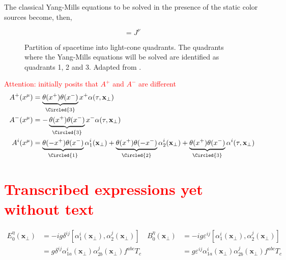 The classical Yang-Mills equations to be solved in the presence of the static color sources become, then,

\begin{equation}
	 [D_\mu, F^{\mu \nu}] = J^\nu
\end{equation}


\begin{figure}

\centering
\caption{Partition of spacetime into light-cone quadrants. The quadrants where the Yang-Mills equations will be solved are identified as quadrants 1, 2 and 3. Adapted from \citep{Kovner_1995}.}
\label{fig:space_partition}
\end{figure}

\begin{figure}

\centering
\caption{}
\end{figure}


\textcolor{red}{Attention: \citep{Kovner_1995} initially posits that $A^+$ and $A^-$ are different}
\begin{equation}
\begin{split}
A^+ (x^\mu) &= \underbrace{\theta (x^+) \theta(x^-)}_{\Circled{3}} x^+ \alpha (\tau, \mathbf{x}_\perp)\\
A^- (x^\mu) &= - \underbrace{\theta (x^+) \theta(x^-)}_{\Circled{3}} x^- \alpha (\tau, \mathbf{x}_\perp) \\
A^{i}(x^\mu) &= \underbrace{\theta (-x^+) \theta(x^-)}_{\Circled{1}} \alpha^i_1 (\mathbf{x}_\perp)
 + \underbrace{\theta (x^+) \theta(-x^-)}_{\Circled{2}} \alpha^i_2 (\mathbf{x}_\perp) 
 + \underbrace{\theta (x^+) \theta(x^-)}_{\Circled{3}} \alpha^i (\tau, \mathbf{x}_\perp) 
\end{split}
\end{equation}

\section{\textcolor{red}{Transcribed expressions yet without text}}

\begin{subequations} \label{eq:initial_fields}
\begin{equation}
\begin{split}
E^\eta_0(\mathbf{x}_\perp) & = -ig \delta^{ij} [\alpha^i_1 (\mathbf{x}_\perp), \alpha^j_2(\mathbf{x}_\perp)] \\
 & = g \delta^{ij}   \alpha^i_{1a} (\mathbf{x}_\perp) \alpha^j_{2b}(\mathbf{x}_\perp)f^{abc} T_c
\end{split} \label{eq:initial_E}
\end{equation}
\begin{equation}
\begin{split}
B^\eta_0(\mathbf{x}_\perp) & = -ig \varepsilon^{ij} [\alpha^i_1 (\mathbf{x}_\perp), \alpha^j_2(\mathbf{x}_\perp)] \\
& = g \varepsilon^{ij} \alpha^i_{1a} (\mathbf{x}_\perp) \alpha^j_{2b}(\mathbf{x}_\perp) f^{abc} T_c
\end{split} \label{eq:initial_B}
\end{equation}
\end{subequations}

